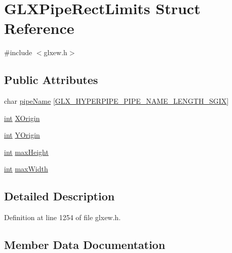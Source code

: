 \hypertarget{struct_g_l_x_pipe_rect_limits}{}\section{G\+L\+X\+Pipe\+Rect\+Limits Struct Reference}
\label{struct_g_l_x_pipe_rect_limits}


{\ttfamily \#include $<$glxew.\+h$>$}

\subsection*{Public Attributes}
\begin{DoxyCompactItemize}
\item 
char \hyperlink{struct_g_l_x_pipe_rect_limits_ae78b4b6656101bc841946733a5b6e5ce}{pipe\+Name} \mbox{[}\hyperlink{glxew_8h_ae1c8261c0861010d8003a31d07e26005}{G\+L\+X\+\_\+\+H\+Y\+P\+E\+R\+P\+I\+P\+E\+\_\+\+P\+I\+P\+E\+\_\+\+N\+A\+M\+E\+\_\+\+L\+E\+N\+G\+T\+H\+\_\+\+S\+G\+I\+X}\mbox{]}
\item 
\hyperlink{wglew_8h_a500a82aecba06f4550f6849b8099ca21}{int} \hyperlink{struct_g_l_x_pipe_rect_limits_a3e5a965059d9f5d2ca42acd35af5bb9b}{X\+Origin}
\item 
\hyperlink{wglew_8h_a500a82aecba06f4550f6849b8099ca21}{int} \hyperlink{struct_g_l_x_pipe_rect_limits_a50e06bcf0dae95854be7d93a515199e9}{Y\+Origin}
\item 
\hyperlink{wglew_8h_a500a82aecba06f4550f6849b8099ca21}{int} \hyperlink{struct_g_l_x_pipe_rect_limits_a27572e499c0d3280031c2ad8e387c0c1}{max\+Height}
\item 
\hyperlink{wglew_8h_a500a82aecba06f4550f6849b8099ca21}{int} \hyperlink{struct_g_l_x_pipe_rect_limits_a8662c7a712b30620e25fc994adf337a1}{max\+Width}
\end{DoxyCompactItemize}


\subsection{Detailed Description}


Definition at line 1254 of file glxew.\+h.



\subsection{Member Data Documentation}
\hypertarget{struct_g_l_x_pipe_rect_limits_a27572e499c0d3280031c2ad8e387c0c1}{}
